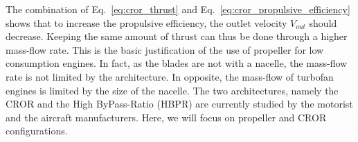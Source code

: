 The combination of Eq.~\eqref{eq:cror_thrust} and 
Eq.~\eqref{eq:cror_propulsive_efficiency} shows 
that to increase the propulsive efficiency, the outlet
velocity $V_{out}$ should decrease. Keeping the same amount
of thrust can thus be done through a higher mass-flow rate. This is 
the basic justification of the use of propeller for low consumption engines.
In fact, as the blades are not with a nacelle, the mass-flow rate is not limited
by the architecture. In opposite, the mass-flow of 
turbofan engines is limited by the size of the nacelle. The two architectures,
namely the CROR and the High ByPass-Ratio (HBPR) are currently studied by
the motorist and the aircraft manufacturers. Here, we will focus on
propeller and CROR configurations.

